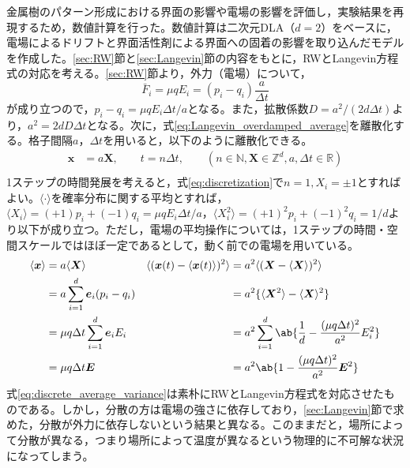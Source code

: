 \documentclass[autodetect-engine,dvi=dvipdfmx,a4paper,ja=standard,oneside,openany,11pt,draft]{bxjsbook}
\begin{document}
金属樹のパターン形成における界面の影響や電場の影響を評価し，実験結果を再現するため，数値計算を行った。数値計算は二次元DLA（$d=2$）をベースに，電場によるドリフトと界面活性剤による界面への固着の影響を取り込んだモデルを作成した。\ref{sec:RW}節と\ref{sec:Langevin}節の内容をもとに，RWとLangevin方程式の対応を考える。\ref{sec:RW}節より，外力（電場）について，
\begin{equation}
  \bar{F}_i=\mu q E_i=(p_i-q_i)\frac{a}{\Delta t}
  \label{eq:force}
\end{equation}が成り立つので，$p_i-q_i=\mu q E_i\Delta t/a$となる。また，拡散係数$D=a^2/(2d\Delta t)$より，$a^2=2dD\Delta t$となる。次に，式\eqref{eq:Langevin_overdamped_average}を離散化する。格子間隔$a$，$\Delta t$を用いると，以下のように離散化できる。
\begin{equation}
  \begin{split}
    \bm{x} & =a\bm{X}, \qquad t=n\Delta t, \qquad (n\in\mathbb{N},\bm{X}\in\mathbb{Z}^d,a,\Delta t \in \mathbb{R}) \\
    \label{eq:discretization}
  \end{split}
\end{equation}
1ステップの時間発展を考えると，式\eqref{eq:discretization}で$n=1,X_i=\pm1$とすればよい。$\langle\cdot\rangle$を確率分布に関する平均とすれば，$\langle X_i\rangle=(+1)p_i+(-1)q_i=\mu q E_i\Delta t/a$，$\langle X_i^2\rangle=(+1)^2p_i+(-1)^2q_i=1/d$より以下が成り立つ。ただし，電場の平均操作については，1ステップの時間・空間スケールではほぼ一定であるとして，動く前での電場を用いている。
\begin{equation}
  \begin{aligned}
    \langle\bm{x}\rangle & =a\langle\bm{X}\rangle                     & \langle(\bm{x}(t)-\langle\bm{x}(t)\rangle)^2\rangle & =a^2\langle(\bm{X}-\langle\bm{X}\rangle)^2\rangle                        \\
                         & =a\sum_{i=1}^{d}\bm{e}_i(p_i-q_i)          &                                                     & =a^2\{\langle\bm{X}^2\rangle-\langle\bm{X}\rangle^2\}                    \\
                         & =\mu q \Delta t\sum_{i=1}^{d} \bm{e}_i E_i &                                                     & =a^2\sum_{i=1}^{d}\ab\{\frac{1}{d}-\frac{(\mu q \Delta t)^2}{a^2}E_i^2\} \\
                         & =\mu q \Delta t\bm{E}                      &                                                     & =a^2\ab\{1-\frac{(\mu q \Delta t)^2}{a^2}\bm{E}^2\}                      \\
  \end{aligned}
  \label{eq:discrete_average_variance}
\end{equation}
式\ref{eq:discrete_average_variance}は素朴にRWとLangevin方程式を対応させたものである。しかし，分散の方は電場の強さに依存しており，\ref{sec:Langevin}節で求めた，分散が外力に依存しないという結果と異なる。このままだと，場所によって分散が異なる，つまり場所によって温度が異なるという物理的に不可解な状況になってしまう。
\end{document}

